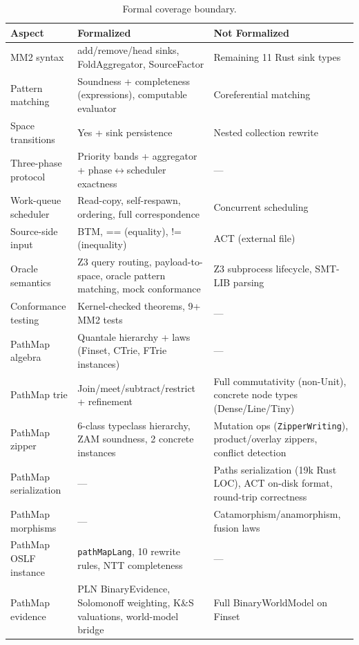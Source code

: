 \documentclass[11pt]{article}
\theoremstyle{definition}
\theoremstyle{remark}
\newcommand{\PathMap}{\textup{PathMap}}
\begin{document}
\begin{table}[ht!]
\centering
\small
\caption{Formal coverage boundary.}
\label{tab:coverage}
\begin{tabular}{@{}lp{5cm}p{4cm}@{}}
\toprule
\textbf{Aspect} & \textbf{Formalized} & \textbf{Not Formalized} \\
\midrule
MM2 syntax                     & add/remove/head sinks, FoldAggregator, SourceFactor & Remaining 11 Rust sink types \\
Pattern matching               & Soundness + completeness (expressions), computable evaluator & Coreferential matching \\
Space transitions              & Yes + sink persistence & Nested collection rewrite \\
Three-phase protocol           & Priority bands + aggregator + phase$\leftrightarrow$scheduler exactness & --- \\
Work-queue scheduler           & Read-copy, self-respawn, ordering, full correspondence & Concurrent scheduling \\
Source-side input              & BTM, == (equality), != (inequality) & ACT (external file) \\
Oracle semantics               & Z3 query routing, payload-to-space, oracle pattern matching, mock conformance & Z3 subprocess lifecycle, SMT-LIB parsing \\
Conformance testing            & Kernel-checked theorems, 9+ MM2 tests & --- \\
\PathMap{} algebra             & Quantale hierarchy + laws (Finset, CTrie, FTrie instances) & --- \\
\PathMap{} trie                & Join/meet/subtract/restrict + refinement & Full commutativity (non-Unit), concrete node types (Dense/Line/Tiny) \\
\PathMap{} zipper              & 6-class typeclass hierarchy, ZAM soundness, 2 concrete instances & Mutation ops (\texttt{ZipperWriting}), product/overlay zippers, conflict detection \\
\PathMap{} serialization       & --- & Paths serialization (19k Rust LOC), ACT on-disk format, round-trip correctness \\
\PathMap{} morphisms           & --- & Catamorphism/anamorphism, fusion laws \\
\PathMap{} OSLF instance       & \texttt{pathMapLang}, 10 rewrite rules, NTT completeness & --- \\
\PathMap{} evidence            & PLN BinaryEvidence, Solomonoff weighting, K\&S valuations, world-model bridge & Full BinaryWorldModel on Finset \\

\end{tabular}
\end{table}
\end{document}
